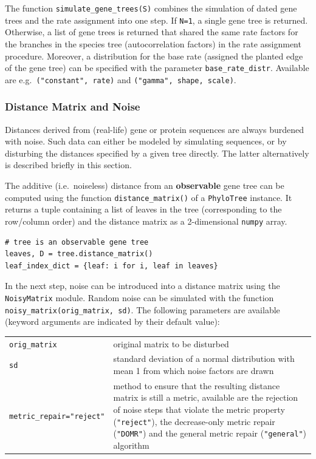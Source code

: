 \documentclass[hidelinks,11pt]{article}
\begin{document}
\noindent
The function \texttt{simulate\_gene\_trees(S)} combines the simulation of dated gene trees and the rate assignment into one step.
If \texttt{N=1}, a single gene tree is returned.
Otherwise, a list of gene trees is returned that shared the same rate factors for the branches in the species tree (autocorrelation factors) in the rate assignment procedure.
Moreover, a distribution for the base rate (assigned the planted edge of the gene tree) can be specified with the parameter \texttt{base\_rate\_distr}.
Available are e.g.\ \texttt{("constant", rate)} and \texttt{("gamma", shape, scale)}.


\subsubsection{Distance Matrix and Noise}

Distances derived from (real-life) gene or protein sequences are always burdened with noise.
Such data can either be modeled by simulating sequences, or by disturbing the distances specified by a given tree directly.
The latter alternatively is described briefly in this section.

The additive (i.e.\ noiseless) distance from an \textbf{observable} gene tree can be computed using the function \texttt{distance\_matrix()} of a \texttt{PhyloTree} instance.
It returns a tuple containing a list of leaves in the tree (corresponding to the row/column order) and the distance matrix as a 2-dimensional \texttt{numpy} array.

\begin{adjustwidth}{1cm}{1cm}\vspace{2mm}
\begin{verbatim}
# tree is an observable gene tree
leaves, D = tree.distance_matrix()
leaf_index_dict = {leaf: i for i, leaf in leaves}
\end{verbatim}
\end{adjustwidth}

In the next step, noise can be introduced into a distance matrix using the \texttt{NoisyMatrix} module.
Random noise can be simulated with the function \texttt{noisy\_matrix(orig\_matrix, sd)}.
The following parameters are available (keyword arguments are indicated by their default value):

\vspace{3mm}
{\small\centering
\begin{longtable}{ p{4.5cm} p{9cm} }
	\texttt{orig\_matrix} & original matrix to be disturbed\\
	\texttt{sd}  & standard deviation of a normal distribution with mean 1 from which noise factors are drawn\\
	\texttt{metric\_repair="reject"}  & method to ensure that the resulting distance matrix is still a metric, available are the rejection of noise steps that violate the metric property (\texttt{"reject"}), the decrease-only metric repair (\texttt{"DOMR"}) and the general metric repair (\texttt{"general"}) algorithm\\
\end{longtable}
}
\vspace{3mm}
\end{document}
